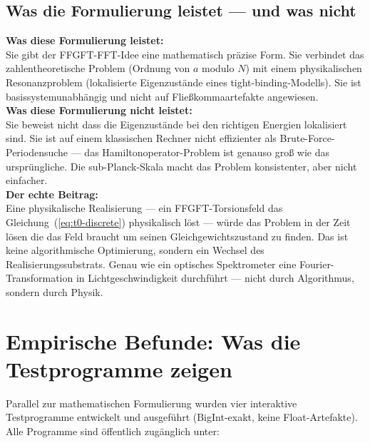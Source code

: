 \subsection{Was die Formulierung leistet ---
  und was nicht}

\begin{important}
\textbf{Was diese Formulierung leistet:}\\
Sie gibt der FFGFT-FFT-Idee eine mathematisch präzise Form.
Sie verbindet das zahlentheoretische Problem
(Ordnung von $a$ modulo $N$)
mit einem physikalischen Resonanzproblem
(lokalisierte Eigenzustände eines tight-binding-Modells).
Sie ist basissystemunabhängig und
nicht auf Fließkommaartefakte angewiesen.\\[6pt]

\textbf{Was diese Formulierung nicht leistet:}\\
Sie beweist nicht dass die Eigenzustände bei den
richtigen Energien lokalisiert sind.
Sie ist auf einem klassischen Rechner nicht effizienter
als Brute-Force-Periodensuche
--- das Hamiltonoperator-Problem ist genauso groß
wie das ursprüngliche.
Die sub-Planck-Skala macht das Problem konsistenter,
aber nicht einfacher.\\[6pt]

\textbf{Der echte Beitrag:}\\
Eine physikalische Realisierung --- ein FFGFT-Torsionsfeld
das Gleichung~(\ref{eq:t0-discrete}) physikalisch löst ---
würde das Problem in der Zeit lösen die das Feld
braucht um seinen Gleichgewichtszustand zu finden.
Das ist keine algorithmische Optimierung,
sondern ein Wechsel des Realisierungssubstrats.
Genau wie ein optisches Spektrometer eine Fourier-Transformation
in Lichtgeschwindigkeit durchführt ---
nicht durch Algorithmus, sondern durch Physik.
\end{important}

\section{Empirische Befunde: Was die Testprogramme zeigen}
\label{sec:empirisch}

Parallel zur mathematischen Formulierung wurden vier
interaktive Testprogramme entwickelt und ausgeführt
(BigInt-exakt, keine Float-Artefakte).
Alle Programme sind öffentlich zugänglich unter:

